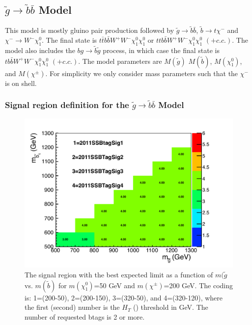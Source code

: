 \clearpage

\subsection{$\widetilde{g} \to \widetilde{b}\bar{b}$ Model}
\label{sec:gbb}
This model is mostly gluino pair production followed by 
$\widetilde{g} \to \widetilde{b}\bar{b}$, $\widetilde{b} \to t \chi^{-}$ and
$\chi^{-} \to W^- \chi_1^0$. 
The final state is $t\bar{t}b\bar{b}W^+W^- \chi_1^0 \chi_1^0$
or $ttb\bar{b}W^+W^- \chi_1^0 \chi_1^0$ $(+ c.c.)$.
The model also includes the $b g \to \widetilde{b} \widetilde{g}$ process,
in which case the final state is
$tb\bar{b}W^+W^- \chi_1^0 \chi_1^0$ $(+ c.c.)$. 
The model parameters are $M(\widetilde{g})$
$M(\widetilde{b})$, $M(\chi_1^0)$, and $M(\chi^{\pm})$.
For simplicity we only consider mass parameters such that the $\chi^{-}$ is on shell.

\subsubsection{Signal region definition for the $\widetilde{g} \to \widetilde{b}\bar{b}$ Model}
\label{sec:gbbdefinition}

\begin{figure}[htb]
\begin{center}
\includegraphics[width=0.65\linewidth]{figs/gl_sb_300_50_regions.pdf}
\caption{The signal region with the best expected limit as a function of 
$m(\widetilde{g}$ vs. $m(\widetilde{b})$ for $m(\chi^0_1)$=50 GeV
and $m(\chi^{\pm})$=200 GeV. 
The coding is: 1=(200-50), 2=(200-150), 3=(320-50), and 4=(320-120), where
the first (second) number is the $H_T$ (\met) threshold in GeV. The number
of requested btags is 2 or more.
\label{fig:gluinosboptimize}}
\end{center}
\end{figure}



